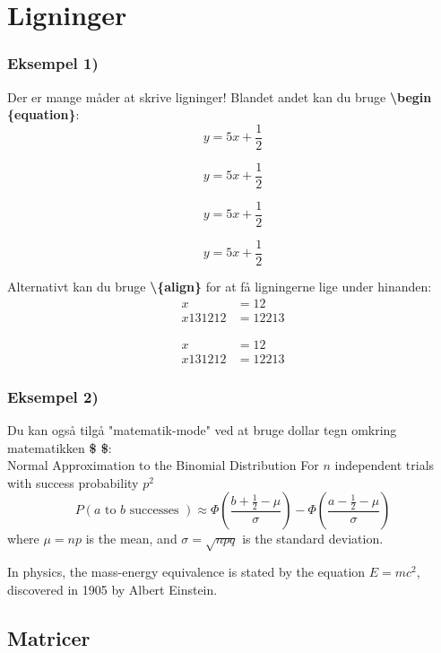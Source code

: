 \section{Ligninger}

\subsubsection*{Eksempel 1)}
Der er mange måder at skrive ligninger! Blandet andet kan du bruge \textbf{\textbackslash begin \{equation\}}:
\begin{equation}
    y=5x+\frac{1}{2}
\end{equation}

\begin{equation*}
    y=5x+\frac{1}{2}
\end{equation*}

$$y=5x+\frac{1}{2}$$

\[y=5x+\frac{1}{2}\]

Alternativt kan du bruge \textbf{\textbackslash \{align\}} for at få ligningerne lige under hinanden:
\begin{align*}
    x&=12\\
    x131212&=12213
\end{align*}

\begin{align}
    x&=12\\
    x131212&=12213
\end{align}

\subsubsection*{Eksempel 2)}
Du kan også tilgå "matematik-mode" ved at bruge dollar tegn omkring matematikken \textbf{\$ \$}: \\
Normal Approximation to the Binomial Distribution
For $n$ independent trials with success probability $p^2$
$$
P(a \text { to } b \text { successes }) \approx \Phi\left(\frac{b+\frac{1}{2}-\mu}{\sigma}\right)-\Phi\left(\frac{a-\frac{1}{2}-\mu}{\sigma}\right)
$$
where $\mu=n p$ is the mean, and $\sigma=\sqrt{n p q}$ is the standard deviation.



In physics, the mass-energy equivalence is stated 
by the equation $E=mc^2$, discovered in 1905 by Albert Einstein.

\subsection*{Matricer}
